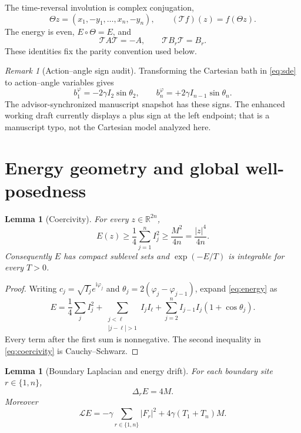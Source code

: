 \documentclass[11pt]{article}
\newtheorem{lemma}[theorem]{Lemma}
\theoremstyle{remark}
\newtheorem{remark}[theorem]{Remark}
\newcommand{\R}{\mathbb R}
\newcommand{\cL}{\mathcal L}
\newcommand{\Thetaop}{\mathcal T}
\begin{document}
The time-reversal involution is complex conjugation,
\begin{equation}\label{eq:theta}
 \Theta z=(x_1,-y_1,\ldots,x_n,-y_n),
 \qquad (\Thetaop f)(z)=f(\Theta z).
\end{equation}
The energy is even, $E\circ\Theta=E$, and
\begin{equation}\label{eq:time-reversal-operators}
 \Thetaop A\Thetaop=-A,
 \qquad \Thetaop B_r\Thetaop=B_r.
\end{equation}
These identities fix the parity convention used below.

\begin{remark}[Action--angle sign audit]\label{rem:sign}
Transforming the Cartesian bath in \eqref{eq:sde} to action--angle variables
gives
\[
 b^{\varphi}_1=-2\gamma I_2\sin\theta_2,
 \qquad
 b^{\varphi}_n=+2\gamma I_{n-1}\sin\theta_n.
\]
The advisor-synchronized manuscript snapshot has these signs.  The enhanced
working draft currently displays a plus sign at the left endpoint; that is a
manuscript typo, not the Cartesian model analyzed here.
\end{remark}

\section{Energy geometry and global well-posedness}

\begin{lemma}[Coercivity]\label{lem:coercivity}
For every $z\in\R^{2n}$,
\begin{equation}\label{eq:coercivity}
 E(z)\ge\frac14\sum_{j=1}^n I_j^2
 \ge\frac{M^2}{4n}=\frac{|z|^4}{4n}.
\end{equation}
Consequently $E$ has compact sublevel sets and
$\exp(-E/T)$ is integrable for every $T>0$.
\end{lemma}

\begin{proof}
Writing $c_j=\sqrt{I_j}e^{\mathrm i\varphi_j}$ and
$\theta_j=2(\varphi_j-\varphi_{j-1})$, expand \eqref{eq:energy} as
\[
 E=\frac14\sum_j I_j^2
 +\sum_{\substack{j<\ell\\|j-\ell|>1}}I_jI_\ell
 +\sum_{j=2}^n I_{j-1}I_j(1+\cos\theta_j).
\]
Every term after the first sum is nonnegative.  The second inequality in
\eqref{eq:coercivity} is Cauchy--Schwarz.
\end{proof}

\begin{lemma}[Boundary Laplacian and energy drift]\label{lem:laplacian}
For each boundary site $r\in\{1,n\}$,
\begin{equation}\label{eq:laplacian}
 \Delta_rE=4M.
\end{equation}
Moreover
\begin{equation}\label{eq:LE}
 \cL E=-\gamma\sum_{r\in\{1,n\}}|F_r|^2
 +4\gamma(T_1+T_n)M.
\end{equation}
\end{lemma}
\end{document}
